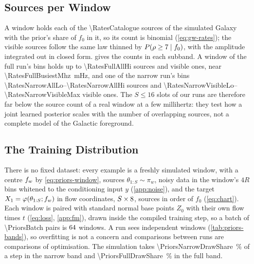 \subsection{Sources per Window}
\label{app:priors-counts}

A window holds each of the \num{\RatesCatalogue} sources of the simulated Galaxy with the prior's share
of $f_0$ in it, so its count is binomial (\cref{eq:gw-rates}); the visible sources follow the same law
thinned by $P(\rho\ge7\mid f_0)$, with the amplitude integrated out in closed form.
 gives the counts in each subband. A window of the full run's
\RatesFullWindow{} bins holds up to \num{\RatesFullAllHi} sources and \RatesFullVisibleMax{} visible
ones, near \qty{\RatesFullBusiestMhz}{\milli\hertz}, and one of the narrow run's \RatesNarrowWindow{}
bins \numrange{\RatesNarrowAllLo}{\RatesNarrowAllHi} sources and
\numrange{\RatesNarrowVisibleLo}{\RatesNarrowVisibleMax} visible ones. The $S\le16$ slots of our runs
are therefore far below the source count of a real window at a few millihertz: they test how a joint
learned posterior scales with the number of overlapping sources, not a complete model of the
Galactic foreground.

\subsection{The Training Distribution}
\label{app:priors-training}

There is no fixed dataset: every example is a freshly simulated window, with a centre $f_{w}$ by
\cref{eq:priors-window}, sources $\theta_{1:S}\sim\pi_w$, noisy data in the window's $4R$ bins whitened
to the conditioning input $y$ (\cref{app:noise}), and the target $X_1 = \varphi(\theta_{1:S};f_{w})$ in
flow coordinates, $S\times8{}$, sources in order of $f_0$ (\cref{eq:chart}). Each window
is paired with \PriorsDraws{} standard normal base points $Z_0$ with their own flow times $t$
(\cref{eq:loss}, \cref{app:fm}), drawn inside the compiled training step, so a batch of
\num{\PriorsBatch} pairs is $64{}$ windows. A run sees
 independent windows
(\cref{tab:priors-bands}), so overfitting is not a concern and comparisons between runs are
comparisons of optimisation. The simulation takes \qty{\PriorsNarrowDrawShare}{\percent} of a step in
the narrow band and \qty{\PriorsFullDrawShare}{\percent} in the full band.
